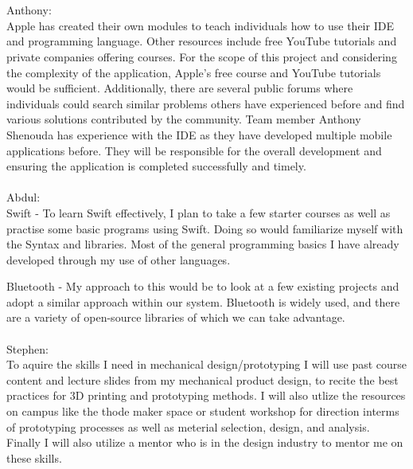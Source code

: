 \documentclass[12pt]{article}
\begin{document}
\begin{enumerate}
\\
\\
Anthony:
\\
Apple has created their own modules to teach individuals how to use their IDE and programming language. Other resources include free YouTube tutorials and private companies offering courses. For the scope of this project and considering the complexity of the application, Apple’s free course and YouTube tutorials would be sufficient. Additionally, there are several public forums where individuals could search similar problems others have experienced before and find various solutions contributed by the community. Team member Anthony Shenouda has experience with the IDE as they have developed multiple mobile applications before. They will be responsible for the overall development and ensuring the application is completed successfully and timely. 
\\
\\
Abdul:
\\ 
 Swift -  To learn Swift effectively, I plan to take a few starter courses as well as practise some basic programs using Swift. Doing so would familiarize myself with the Syntax and libraries. Most of the general programming basics I have already developed through my use of other languages. 
  
 Bluetooth - My approach to this would be to look at a few existing projects and adopt a similar approach within our system. Bluetooth is widely used, and there are a variety of open-source libraries of which we can take advantage.
\\
\\
Stephen:
\\
 To aquire the skills I need in mechanical design/prototyping I will use past course content and lecture slides from my mechanical product design, to recite the best practices for 3D printing and prototyping methods. I will also utlize the resources on campus like the thode maker space or student workshop for direction interms of prototyping processes as well as meterial selection, design, and analysis.  Finally I will also utilize a mentor who is in the design industry to mentor me on these skills.
\end{enumerate}
\end{document}
